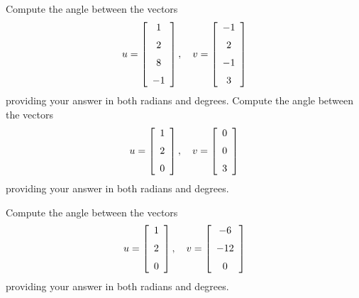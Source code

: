 \documentclass[12pt]{amsbook}
\numberwithin{equation}{section}
\theoremstyle{plain} %
\theoremstyle{definition}
\theoremstyle{remark}
\begin{document}
\begin{Exercise}[title={Angle between vectors}, difficulty = 0, label = exmm]
\Question	Compute the angle between the vectors
	$$u =  \left[ \begin {array}{c} 
	1 \\ \noalign{\medskip}       
	2 \\ \noalign{\medskip} 
	8 \\ \noalign{\medskip}        
	-1\end {array}
	\right], \quad v=
	\left[ \begin {array}{cccc} 
	-1  \\ \noalign{\medskip} 
    2 \\ \noalign{\medskip}              
	-1  \\ \noalign{\medskip}        
	3 \end {array}
	\right] 
	$$
	providing your answer in both radians and degrees.
\Question
Compute the angle between the vectors
$$u =  \left[ \begin {array}{c} 
1 \\ \noalign{\medskip}       
2 \\ \noalign{\medskip}       
0\end {array}
\right], \quad v=
\left[ \begin {array}{cccc} 
0 \\ \noalign{\medskip}             
0  \\ \noalign{\medskip}        
3 \end {array}
\right] 
$$
providing your answer in both radians and degrees.

\Question
Compute the angle between the vectors
$$u =  \left[ \begin {array}{c} 
1 \\ \noalign{\medskip}       
2 \\ \noalign{\medskip}       
0\end {array}
\right], \quad v=
\left[ \begin {array}{cccc} 
-6 \\ \noalign{\medskip}             
-12  \\ \noalign{\medskip}        
0 \end {array}
\right] 
$$
providing your answer in both radians and degrees.


\end{Exercise}



\bigskip
\end{document}
